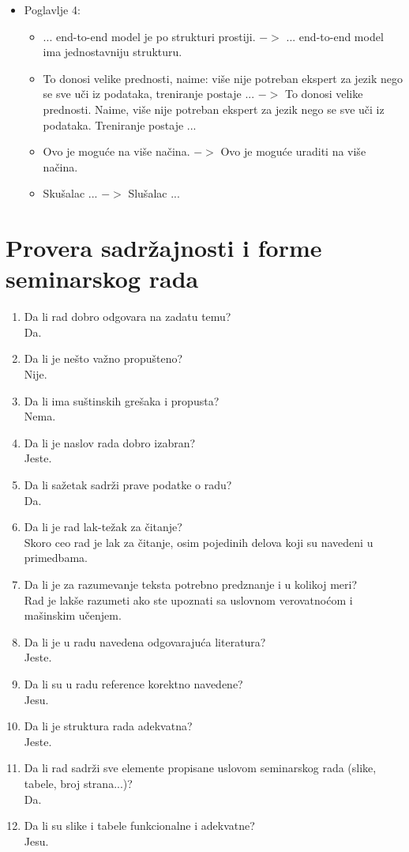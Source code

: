 \documentclass[a4paper]{report}
\begin{document}
\begin{itemize}
    \item Poglavlje 4:
    \begin{itemize}
        \item ... end-to-end model je po strukturi prostiji. $->$ ... end-to-end model ima jednostavniju strukturu.
        \item To donosi velike prednosti, naime: više nije potreban ekspert za jezik nego se sve uči iz podataka, treniranje postaje ... $->$ 
        To donosi velike prednosti. Naime, više nije potreban ekspert za jezik nego se sve uči iz podataka. Treniranje postaje ...
        \item Ovo je moguće na više načina. $->$ Ovo je moguće uraditi na više načina.
        \item Skušalac ... $->$ Slušalac ...
    \end{itemize}
\end{itemize}
  

\section{Provera sadržajnosti i forme seminarskog rada}

\begin{enumerate}
\item Da li rad dobro odgovara na zadatu temu?\\
Da.
\item Da li je nešto važno propušteno?\\
Nije.
\item Da li ima suštinskih grešaka i propusta?\\
Nema.
\item Da li je naslov rada dobro izabran?\\
Jeste.
\item Da li sažetak sadrži prave podatke o radu?\\
Da.
\item Da li je rad lak-težak za čitanje?\\
Skoro ceo rad je lak za čitanje, osim pojedinih delova koji su navedeni u primedbama.
\item Da li je za razumevanje teksta potrebno predznanje i u kolikoj meri?\\
Rad je lakše razumeti ako ste upoznati sa uslovnom verovatnoćom i mašinskim učenjem.
\item Da li je u radu navedena odgovarajuća literatura?\\
Jeste.
\item Da li su u radu reference korektno navedene?\\
Jesu.
\item Da li je struktura rada adekvatna?\\
Jeste.
\item Da li rad sadrži sve elemente propisane uslovom seminarskog rada (slike, tabele, broj strana...)?\\
Da.
\item Da li su slike i tabele funkcionalne i adekvatne?\\
Jesu.
\end{enumerate}
\end{document}
